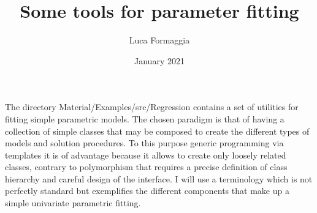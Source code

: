 \documentclass{article}
\author{Luca Formaggia}
\title{Some tools for parameter fitting}
\date{January 2021}
\newcommand{\onlyprogramname}[1]{Material/Examples/src/#1}
\begin{document}
\maketitle

The directory \onlyprogramname{Regression} contains a set of utilities
for fitting simple parametric models.  The chosen paradigm is that of having a
collection of simple classes that may be composed to create the
different types of models and solution procedures.  To this purpose
generic programming via templates it is of advantage because it allows
to create only loosely related classes, contrary to polymorphism that
requires a precise definition of class hierarchy and careful design of
the interface.  I will use a terminology which is not perfectly
standard but exemplifies the different components that make up a
simple univariate parametric fitting.
\end{document}

